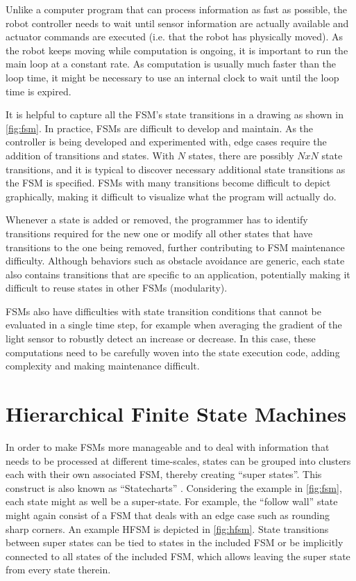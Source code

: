 Unlike a computer program that can process information as fast as possible, the robot controller needs to wait until sensor information are actually available and actuator commands are executed (i.e. that the robot has physically moved). As the robot keeps moving while computation is ongoing, it is important to run the main loop at a constant rate. As computation is usually much faster than the loop time, it might be necessary to use an internal clock to wait until the loop time is expired.



It is helpful to capture all the FSM's state transitions in a drawing as shown in \cref{fig:fsm}. In practice, FSMs are difficult to develop and maintain. As the controller is being developed and experimented with, edge cases require the addition of transitions and states. With $N$ states, there are possibly $NxN$ state transitions, and it is typical to discover necessary additional state transitions as the FSM is specified. FSMs with many transitions become difficult to depict graphically, making it difficult to visualize what the program will actually do.

Whenever a state is added or removed, the programmer has to identify transitions required for the new one or modify all other states that have transitions to the one being removed, further contributing to FSM maintenance difficulty. Although behaviors such as obstacle avoidance are generic, each state also contains transitions that are specific to an application, potentially making it difficult to reuse states in other FSMs (modularity). 

FSMs also have difficulties with state transition conditions that cannot be evaluated in a single time step, for example when averaging the gradient of the light sensor to robustly detect an increase or decrease. In this case, these computations need to be carefully woven into the state execution code, adding complexity and making maintenance difficult. 


\section{Hierarchical Finite State Machines}\label{sec:stateflow}
In order to make FSMs more manageable and to deal with information that needs to be processed at different time-scales, states can be grouped into clusters each with their own associated FSM, thereby creating ``super states''. This construct is also known as ``Statecharts'' \cite{harel1987statecharts}. Considering the example in \cref{fig:fsm}, each state might as well be a super-state. For example, the ``follow wall'' state might again consist of a FSM that deals with an edge case such as rounding sharp corners. An example HFSM is depicted in \cref{fig:hfsm}. State transitions between super states can be tied to states in the included FSM or be implicitly connected to all states of the included FSM, which allows leaving the super state from every state therein.

